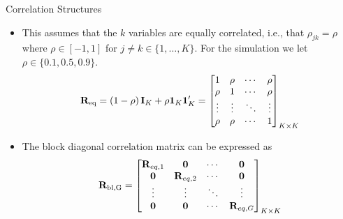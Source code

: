 \documentclass[
  11pt,
  ignorenonframetext,
]{beamer}
\providecommand{\tightlist}{%
  \setlength{\itemsep}{0pt}\setlength{\parskip}{0pt}}
\begin{document}
\begin{frame}{Correlation Structures}
\label{correlation-structures}
\begin{itemize}[<+->]
\tightlist
\item
  This assumes that the \(k\) variables are equally correlated, i.e.,
  that \(\rho_{jk}=\rho\) where \(\rho \in [-1,1]\) for
  \(j \neq k \in \{1, \dots, K\}\). For the simulation we let
  \(\rho \in \{0.1, 0.5, 0.9\}\). \begin{equation}
  \mathbf{R}_{\text{eq}} = \left( 1-\rho \right) \mathbf{I}_K + \rho \boldsymbol{1}_K \boldsymbol{1}'_K = 
  \begin{bmatrix}
  1 & \rho & \cdots & \rho \\
  \rho & 1 & \cdots & \rho \\
  \vdots & \vdots & \ddots & \vdots \\
  \rho & \rho & \cdots & 1
  \end{bmatrix}_{K \times K}
  \notag
  \end{equation}
\end{itemize}

\begin{itemize}[<+->]
\tightlist
\item
  The block diagonal correlation matrix can be expressed as\\
  \begin{equation}
  \mathbf{R}_{\text{bl,G}} = 
  \begin{bmatrix}
  \mathbf{R}_{eq,1} & \mathbf{0} & \cdots & \mathbf{0} \\
  \mathbf{0} & \mathbf{R}_{eq,2} & \cdots & \mathbf{0} \\
  \vdots & \vdots & \ddots & \vdots \\
  \mathbf{0} & \mathbf{0} & \cdots & \mathbf{R}_{eq,G}
  \end{bmatrix}_{K \times K}
  \notag
  \end{equation}
\end{itemize}

\end{frame}
\end{document}

